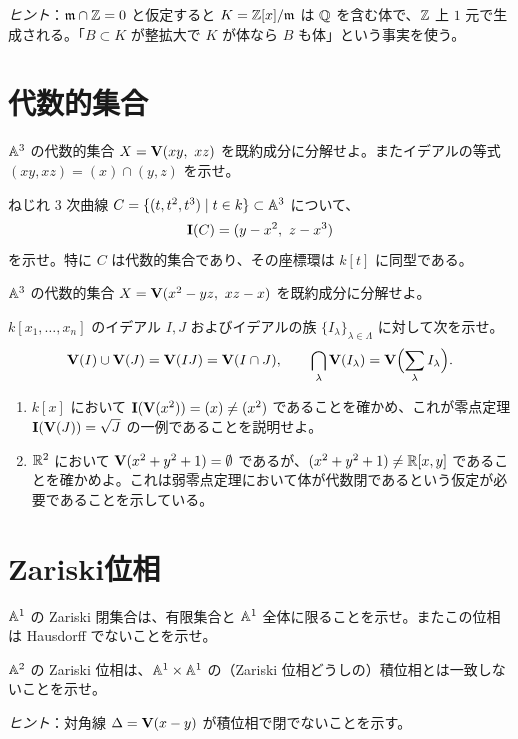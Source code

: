 \noindent\emph{ヒント}：$\mathfrak{m}\cap\mathbb{Z}=0$ と仮定すると $K=\mathbb{Z}[x]/\mathfrak{m}$ は $\mathbb{Q}$ を含む体で、$\mathbb{Z}$ 上 $1$ 元で生成される。「$B\subset K$ が整拡大で $K$ が体なら $B$ も体」という事実を使う。

\section{代数的集合}

$\mathbb{A}^3$ の代数的集合 $X=\mathbf{V}(xy,\ xz)$ を既約成分に分解せよ。またイデアルの等式 $(xy,xz)=(x)\cap(y,z)$ を示せ。

ねじれ $3$ 次曲線 $C=\{(t,t^2,t^3)\mid t\in k\}\subset\mathbb{A}^3$ について、
\[
  \mathbf{I}(C)=(y-x^2,\ z-x^3)
\]
を示せ。特に $C$ は代数的集合であり、その座標環は $k[t]$ に同型である。

$\mathbb{A}^3$ の代数的集合 $X=\mathbf{V}(x^2-yz,\ xz-x)$ を既約成分に分解せよ。

$k[x_1,\dots,x_n]$ のイデアル $I,J$ およびイデアルの族 $\{I_\lambda\}_{\lambda\in\Lambda}$ に対して次を示せ。
\[
  \mathbf{V}(I)\cup\mathbf{V}(J)=\mathbf{V}(IJ)=\mathbf{V}(I\cap J),\qquad
  \bigcap_{\lambda}\mathbf{V}(I_\lambda)=\mathbf{V}\Bigl(\sum_\lambda I_\lambda\Bigr).
\]

\begin{enumerate}
  \item $k[x]$ において $\mathbf{I}(\mathbf{V}(x^2))=(x)\neq(x^2)$ であることを確かめ、これが零点定理 $\mathbf{I}(\mathbf{V}(J))=\sqrt{J}$ の一例であることを説明せよ。
  \item $\mathbb{R}^2$ において $\mathbf{V}(x^2+y^2+1)=\emptyset$ であるが、$(x^2+y^2+1)\neq\mathbb{R}[x,y]$ であることを確かめよ。これは弱零点定理において体が代数閉であるという仮定が必要であることを示している。
\end{enumerate}

\section{Zariski位相}

$\mathbb{A}^1$ の Zariski 閉集合は、有限集合と $\mathbb{A}^1$ 全体に限ることを示せ。またこの位相は Hausdorff でないことを示せ。

$\mathbb{A}^2$ の Zariski 位相は、$\mathbb{A}^1\times\mathbb{A}^1$ の（Zariski 位相どうしの）積位相とは一致しないことを示せ。

\noindent\emph{ヒント}：対角線 $\Delta=\mathbf{V}(x-y)$ が積位相で閉でないことを示す。

